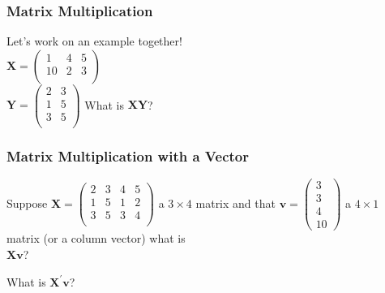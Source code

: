\documentclass{beamer}
\numberwithin{equation}{section}
\begin{document}
\begin{frame}
\frametitle{Matrix Multiplication}

Let's work on an example together!\\
$\boldsymbol{X} = \begin{pmatrix} 1 & 4 & 5 \\
													10 & 2 & 3 \\
							\end{pmatrix} 						$													\\
$\boldsymbol{Y} = \begin{pmatrix} 2 & 3 \\
													1 & 5 \\
													3 & 5\\
							\end{pmatrix} 				$
What is $\boldsymbol{X} \boldsymbol{Y} $?


\pause 


\end{frame}



\begin{frame}
\frametitle{Matrix Multiplication with a Vector} 

Suppose $\boldsymbol{X} = \begin{pmatrix} 2 & 3 & 4 & 5 \\
													1 & 5 & 1 & 2\\
													3 & 5 & 3 & 4 \\
							\end{pmatrix} 	$ a $3 \times 4$ matrix and that $\boldsymbol{v}  = \begin{pmatrix} 3\\ 3 \\ 4 \\ 10 \end{pmatrix} $ a $4 \times 1$ matrix (or a column vector) what is \\
$\boldsymbol{X} \boldsymbol{v}$?


What is $\boldsymbol{X}^{'} \boldsymbol{v}$?

\end{frame}
\end{document}
